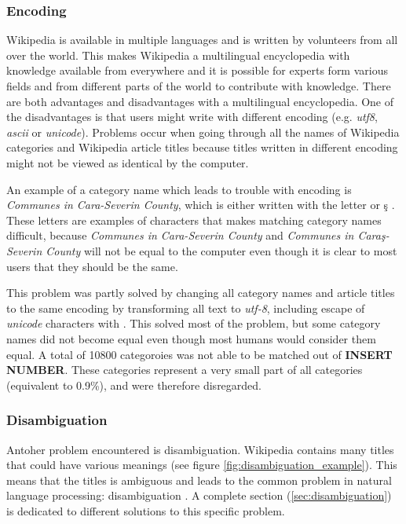 
\subsubsection{Encoding}
Wikipedia is available in multiple languages and is written by volunteers from all over the world. This makes Wikipedia a multilingual encyclopedia with knowledge available from everywhere and it is possible for experts form various fields and from different parts of the world to contribute with knowledge. There are both advantages and disadvantages with a multilingual encyclopedia. One of the disadvantages is that users might write with different encoding (e.g. \emph{utf8}, \emph{ascii} or \emph{unicode}). Problems occur when going through all the names of Wikipedia categories and Wikipedia article titles because titles written in different encoding might not be viewed as identical by the computer. 

An example of a category name which leads to trouble with encoding is  \emph{Communes in Cara-Severin County}, which is either written with the letter \emph{} \cite{swithcomma} or \c{s} \cite{swithcedilla}. These letters are examples of characters that makes matching category names difficult, because \emph{Communes in Cara-Severin County} and \emph{Communes in Cara\c{s}-Severin County} will not be equal to the computer even though it is clear to most users that they should be the same. 

This problem was partly solved by changing all category names and article titles to the same encoding by transforming all text to \emph{utf-8}, including escape of \emph{unicode} characters with \cite{unidecode}. This solved most of the problem, but some category names did not become equal even though most humans would consider them equal. A total of 10800 categoroies was not able to be matched out of \textbf{INSERT NUMBER}. These categories represent a very small part of all categories  (equivalent to 0.9\%), and were therefore disregarded. 


\subsubsection{Disambiguation}
Antoher problem encountered is disambiguation. Wikipedia contains many titles that could have various meanings (see figure \ref{fig:disambiguation_example}). This means that the titles is ambiguous and leads to the common problem in natural language processing: disambiguation \cite{wiki:disambiguation}. A complete section (\ref{sec:disambiguation}) is dedicated to different solutions to this specific problem. 


